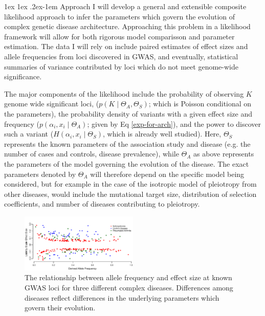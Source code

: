 \documentclass[11pt]{article}
\makeatletter
\renewcommand{\paragraph}{%
  \@startsection{paragraph}{4}%
  {\z@}{1ex \@plus 1ex \@minus .2ex}{-1em}%
  {\normalfont\normalsize\bfseries}%
}
\makeatother
\begin{document}
\paragraph{Approach}
I will develop a general and extensible composite likelihood approach to infer the parameters which govern the evolution of complex genetic disease architecture. Approaching this problem in a likelihood framework will allow for both rigorous model comparisson and parameter estimation\cite{Larribe:2011jb,Coffman:2015by}. The data I will rely on include paired estimates of effect sizes and allele frequencies from loci discovered in GWAS, and eventually, statistical summaries of variance contributed by loci which do not meet genome-wide significance.

The major components of the likelihood include the probability of observing $K$ genome wide significant loci, ($p\left(K \mid \Theta_A , \Theta_S \right)$; which is Poisson conditional on the parameters), the probability density of variants with a given effect size and frequency ($p\left(\alpha_i , x_i \mid \Theta_A \right)$; given by Eq \eqref{exp-for-arch}), and the power to discover such a variant ($H\left(\alpha_i , x_i \mid \Theta_S\right)$, which is already well studied\cite{Sham:2014di}). Here, $\Theta_S$ represents the known parameters of the association study and disease (e.g. the number of cases and controls, disease prevalence), while $\Theta_A$ as above represents the parameters of the model governing the evolution of the disease. The exact parameters denoted by $\Theta_A$ will therefore depend on the specific model being considered, but for example in the case of the isotropic model of pleiotropy from other diseases, would include the mutational target size, distribution of selection coefficients, and number of diseases contributing to pleiotropy.

\begin{figure}
    \includegraphics[width=0.5\textwidth]{../figures/JointSpecFig.pdf}
   \caption{The relationship between allele frequency and effect size at known GWAS loci for three different complex diseases. Differences among diseases reflect differences in the underlying parameters which govern their evolution.}
   \label{joint-freq-effect-dist}
 \end{figure}
\end{document}
